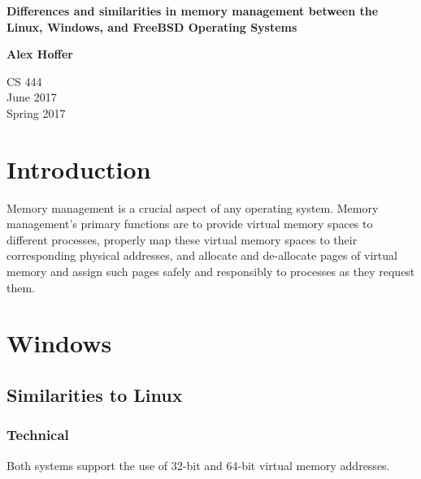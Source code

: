\documentclass[letterpaper,10pt,titlepage]{article}
\begin{document}
\begin{titlepage}
    \begin{center}
        \vspace*{3.5cm}

        \textbf{Differences and similarities in memory management between the Linux, Windows, and FreeBSD Operating Systems}

        \vspace{0.5cm}

        \textbf{Alex Hoffer}

        \vspace{0.8cm}

        CS 444\\
        June 2017\\
	Spring 2017\\

        \vfill

    \end{center}
\end{titlepage}

\newpage

\tableofcontents

\newpage

\section{Introduction}
Memory management is a crucial aspect of any operating system. Memory management's primary functions are to provide virtual memory spaces to different processes, properly map these virtual memory spaces to their corresponding physical addresses, and allocate and de-allocate pages of virtual memory and assign such pages safely and responsibly to processes as they request them.

\section{Windows}
\subsection{Similarities to Linux}
\subsubsection{Technical}
Both systems support the use of 32-bit and 64-bit virtual memory addresses. 
\end{document}
